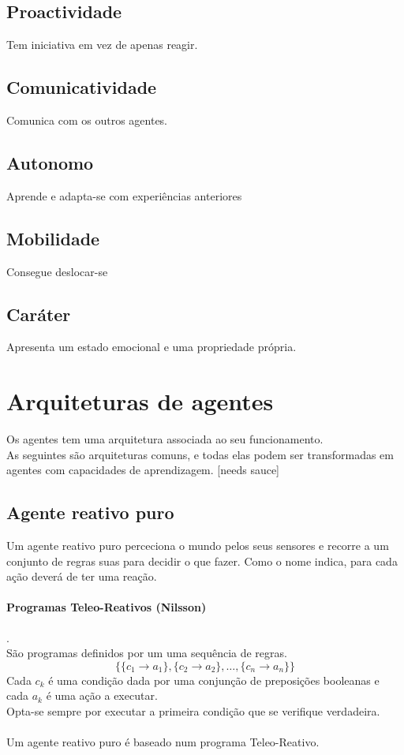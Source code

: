 \documentclass[]{report}
\begin{document}
\subsection{Proactividade}
Tem iniciativa em vez de apenas reagir.
\subsection{Comunicatividade}
Comunica com os outros agentes.
\subsection{Autonomo}
Aprende e adapta-se com experiências anteriores
\subsection{Mobilidade}
Consegue deslocar-se
\subsection{Caráter}
Apresenta um estado emocional e uma propriedade própria.
\clearpage
\section{Arquiteturas de agentes}
Os agentes tem uma arquitetura associada ao seu funcionamento.\\
As seguintes são arquiteturas comuns, e todas elas podem ser transformadas em agentes com capacidades de aprendizagem. [needs sauce]
\subsection{Agente reativo puro}
Um agente reativo puro perceciona o mundo pelos seus sensores e recorre a um conjunto de regras suas para decidir o que fazer. Como o nome indica, para cada ação deverá de ter uma reação.
\paragraph{Programas Teleo-Reativos (Nilsson)}.\\
São programas definidos por um uma sequência de regras.
$$\{\{c_1 \rightarrow a_1\}, \{c_2 \rightarrow a_2\}, \dots, \{c_n \rightarrow a_n\}\}$$
Cada $c_k$ é uma condição dada por uma conjunção de preposições booleanas e cada $a_k$ é uma ação a executar.\\
Opta-se sempre por executar a primeira condição que se verifique verdadeira.\\\\
Um agente reativo puro é baseado num programa Teleo-Reativo.
\end{document}
